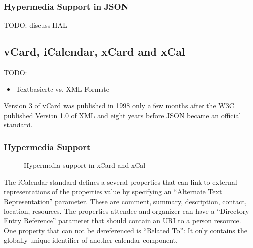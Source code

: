 \documentclass[12pt,a4paper]{scrartcl}		%
\begin{document}
\subsubsection{Hypermedia Support in JSON}

TODO: discuss HAL

\subsection{vCard, iCalendar, xCard and xCal}

TODO:
\begin{itemize}
\item Textbasierte vs. XML Formate
\end{itemize}

Version 3 of vCard was published in 1998\cite{RFC2425} only a few months after
the W3C published Version 1.0 of XML\cite{Paoli:98:XR} and eight years before
JSON became an official standard.\cite{RFC4627}

\subsubsection{Hypermedia Support}

\begin{figure}[tb]

  \caption{Hypermedia support in xCard and xCal}
\end{figure}

The iCalendar standard defines a several properties that can link to external
representations of the properties value by specifying an ``Alternate Text
Representation'' parameter. These are comment, summary, description, contact,
location, resources. The properties attendee and organizer can have a
``Directory Entry Reference'' parameter that should contain an URI to a person
resource. One property that can not be dereferenced is ``Related To'': It only
contains the globally unique identifier of another calendar component.
\end{document}
